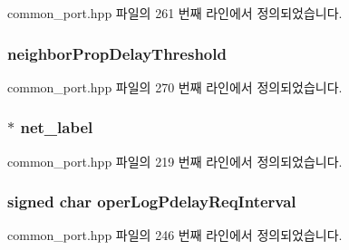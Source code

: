 common\+\_\+port.\+hpp 파일의 261 번째 라인에서 정의되었습니다.

\subsubsection[{\texorpdfstring{neighbor\+Prop\+Delay\+Threshold}{neighborPropDelayThreshold}}]{ neighbor\+Prop\+Delay\+Threshold}\hypertarget{struct_port_init__t_a96819f2beeb4656c9450bb283845e391}{}\label{struct_port_init__t_a96819f2beeb4656c9450bb283845e391}


common\+\_\+port.\+hpp 파일의 270 번째 라인에서 정의되었습니다.

\subsubsection[{\texorpdfstring{net\+\_\+label}{net_label}}]{$\ast$ net\+\_\+label}\hypertarget{struct_port_init__t_a5885d7a835513edd0bbb0a170b4c9f01}{}\label{struct_port_init__t_a5885d7a835513edd0bbb0a170b4c9f01}


common\+\_\+port.\+hpp 파일의 219 번째 라인에서 정의되었습니다.

\subsubsection[{\texorpdfstring{oper\+Log\+Pdelay\+Req\+Interval}{operLogPdelayReqInterval}}]{\setlength{\rightskip}{0pt plus 5cm}signed char oper\+Log\+Pdelay\+Req\+Interval}\hypertarget{struct_port_init__t_a3062b4f36651db612ae70061510ccefb}{}\label{struct_port_init__t_a3062b4f36651db612ae70061510ccefb}


common\+\_\+port.\+hpp 파일의 246 번째 라인에서 정의되었습니다.

